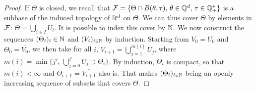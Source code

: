 \begin{proof}
    If $\Theta$ is closed, %
    we recall that $\mathcal{F}=\{\Theta\cap B(\theta,\tau),\,\theta\in\mathbb{Q}^d,\,\tau\in\mathbb{Q}^\ast_+\} $ is a subbase  of the induced topology of $\mathbb{R}^d$ on $\Theta$.
    We can thus cover $\Theta$ by elements in $\mathcal{F}$:
    $\Theta=\bigcup_{i\in I}U_i$. It is possible to index this cover by $\mathbb{N}$. We  now construct the sequences $(\Theta_i)_i\in\mathbb{N}$ and $(V_i)_{i\in\mathbb{N}}$ by induction. Starting from $V_0=U_0$ and $\Theta_0=\overline{V_0}$, we then take for all $i$, $V_{i+1}=\bigcup_{j=1}^{m(i)}U_j $, where $m(i) = \min\{j',\, \bigcup_{j=0}^{j'}U_j \supset {\Theta_i} \}$. %
    By induction, ${\Theta_i}$ is compact, so that $m(i)<\infty$ and $\Theta_{i+1}=\overline{V_{i+1}}$ also is.
That makes $(\Theta_i)_{i\in\mathbb{N}}$ being an openly increasing sequence of subsets that covers $\Theta$.
\end{proof}



